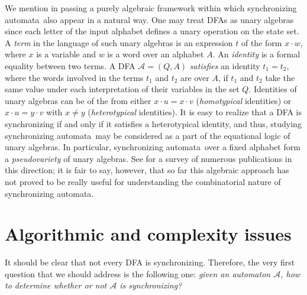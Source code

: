 \documentclass{irmaart}
\newcommand{\sa}{synchronizing au\-tom\-a\-ta}
\theoremstyle{plain}
\begin{document}
We mention in passing a purely algebraic framework within which \sa\ also appear in a natural way. One may treat DFAs
as unary algebras since each letter of the input alphabet defines a unary
operation on the state set. A \emph{term} in the language of
such unary algebras is an expression $t$ of the form $x\cdot w$, where $x$ is a
variable and $w$ is a word over an alphabet $A$. An
\emph{identity} is a formal equality between
two terms. A DFA $\mathcal{A}=(Q,A)$ \emph{satisfies} an identity $t_1=t_2$,
where the words involved in the terms $t_1$ and $t_2$ are over $A$, if $t_1$
and $t_2$ take the same value under each interpretation of their variables in
the set $Q$. Identities of unary algebras can be of the from either $x\cdot
u=x\cdot v$ (\emph{homotypical} identities) or $x\cdot u=y\cdot v$ with $x\ne y$
(\emph{heterotypical} identities). It is easy to realize that a DFA is synchronizing if
and only if it satisfies a heterotypical identity, and thus, studying \sa\ may
be considered as a part of the equational logic of unary algebras. In
particular, \sa\ over a fixed alphabet form a \emph{pseudovariety} of unary
algebras. See \cite{Bogdanovic&Imreh&Ciric&Petkovic:1999} for a survey of
numerous publications in this direction; it is fair to say, however, that so
far this algebraic approach has not proved to be really useful for
understanding the combinatorial nature of \sa.


\section{Algorithmic and complexity issues}

It should be clear that not every DFA is synchronizing. Therefore,
the very first question that we should address is the following
one: \emph{given an automaton $\mathcal{A}$, how to determine
whether or not $\mathcal{A}$ is synchronizing?}
\end{document}
